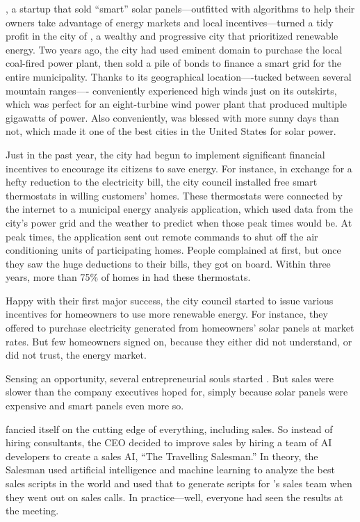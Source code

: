  {\energyCompany}, a startup that sold ``smart'' solar panels---outfitted with algorithms to help their owners take advantage of energy markets and local incentives---turned a tidy profit in the city of {\crunchyCity}, a wealthy and progressive city that prioritized renewable energy. Two years ago, the city had used eminent domain to purchase the local coal-fired power plant, then sold a pile of bonds to finance a smart grid for the entire municipality. Thanks to its geographical location----tucked between several mountain ranges----\crunchyCity{} conveniently experienced high winds just on its outskirts, which was perfect for an eight-turbine wind power plant that produced multiple gigawatts of power. Also conveniently, \crunchyCity{} was blessed with more sunny days than not, which made it one of the best cities in the United States for solar power.

Just in the past year, the city had begun to implement significant financial incentives to encourage its citizens to save energy. For instance, in exchange for a hefty reduction to the electricity bill, the city council installed free smart thermostats in willing customers' homes. These thermostats were connected by the internet to a municipal energy analysis application, which used data from the city's power grid and the weather to predict when those peak times would be. At peak times, the application sent out remote commands to shut off the air conditioning units of participating homes. People complained at first, but once they saw the huge deductions to their bills, they got on board. Within three years, more than 75\% of homes in \crunchyCity{} had these thermostats.

Happy with their first major success, the city council started to issue various incentives for homeowners to use more renewable energy. For instance, they offered to purchase electricity generated from homeowners' solar panels at market rates. But few homeowners signed on, because they either did not understand, or did not trust, the energy market.
 
Sensing an opportunity, several entrepreneurial souls started \energyCompany{}. But sales were slower than the company executives hoped for, simply because solar panels were expensive and smart panels even more so.
 
\energyCompany{} fancied itself on the cutting edge of everything, including sales. So instead of hiring consultants, the CEO decided to improve sales by hiring a team of AI developers to create a sales AI, ``The Travelling Salesman.'' In theory, the Salesman used artificial intelligence and machine learning to analyze the best sales scripts in the world and used that to generate scripts for  \energyCompany{}'s sales team when they went out on sales calls. In practice---well, everyone had seen the results at the meeting.

